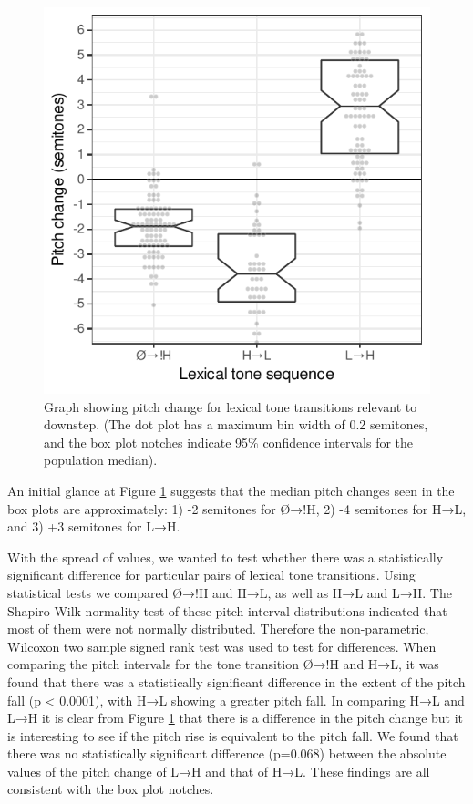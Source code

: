 \documentclass[
  11pt,
  b5paper,
]{article}
\begin{document}
\begin{figure}
\centering
\includegraphics{figure/plot_downstep_transition-1.pdf}
\caption{Graph showing pitch change for lexical tone transitions
relevant to downstep. (The dot plot has a maximum bin width of 0.2
semitones, and the box plot notches indicate 95\% confidence intervals
for the population median).\label{fig:downstep_transition}}
\end{figure}

An initial glance at Figure \ref{fig:downstep_transition} suggests that
the median pitch changes seen in the box plots are approximately: 1) -2
semitones for Ø→!H, 2) -4 semitones for H→L, and 3) +3 semitones for
L→H.

With the spread of values, we wanted to test whether there was a
statistically significant difference for particular pairs of lexical
tone transitions. Using statistical tests we compared Ø→!H and H→L, as
well as H→L and L→H. The Shapiro-Wilk normality test of these pitch
interval distributions indicated that most of them were not normally
distributed. Therefore the non-parametric, Wilcoxon two sample signed
rank test was used to test for differences. When comparing the pitch
intervals for the tone transition Ø→!H and H→L, it was found that there
was a statistically significant difference in the extent of the pitch
fall (p \textless{} 0.0001), with H→L showing a greater pitch fall. In
comparing H→L and L→H it is clear from Figure
\ref{fig:downstep_transition} that there is a difference in the pitch
change but it is interesting to see if the pitch rise is equivalent to
the pitch fall. We found that there was no statistically significant
difference (p=0.068) between the absolute values of the pitch change of
L→H and that of H→L. These findings are all consistent with the box plot
notches.
\end{document}
